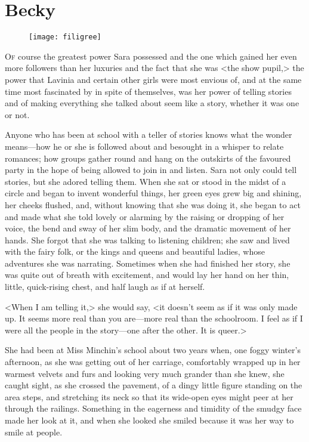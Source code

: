 \chapter{Becky}

\begin{figure}[t!]
\centering
\texttt{[image: filigree]}
\end{figure}

\lettrine[lines=5]{O}{f} course the greatest power Sara possessed and the one which gained her even more followers than her luxuries and the fact that she was <the show pupil,> the power that Lavinia and certain other girls were most envious of, and at the same time most fascinated by in spite of themselves, was her power of telling stories and of making everything she talked about seem like a story, whether it was one or not.

Anyone who has been at school with a teller of stories knows what the wonder means—how he or she is followed about and besought in a whisper to relate romances; how groups gather round and hang on the outskirts of the favoured party in the hope of being allowed to join in and listen. Sara not only could tell stories, but she adored telling them. When she sat or stood in the midst of a circle and began to invent wonderful things, her green eyes grew big and shining, her cheeks flushed, and, without knowing that she was doing it, she began to act and made what she told lovely or alarming by the raising or dropping of her voice, the bend and sway of her slim body, and the dramatic movement of her hands. She forgot that she was talking to listening children; she saw and lived with the fairy folk, or the kings and queens and beautiful ladies, whose adventures she was narrating. Sometimes when she had finished her story, she was quite out of breath with excitement, and would lay her hand on her thin, little, quick-rising chest, and half laugh as if at herself.

<When I am telling it,> she would say, <it doesn't seem as if it was only made up. It seems more real than you are—more real than the schoolroom. I feel as if I were all the people in the story—one after the other. It is queer.>

She had been at Miss Minchin's school about two years when, one foggy winter's afternoon, as she was getting out of her carriage, comfortably wrapped up in her warmest velvets and furs and looking very much grander than she knew, she caught sight, as she crossed the pavement, of a dingy little figure standing on the area steps, and stretching its neck so that its wide-open eyes might peer at her through the railings. Something in the eagerness and timidity of the smudgy face made her look at it, and when she looked she smiled because it was her way to smile at people.

